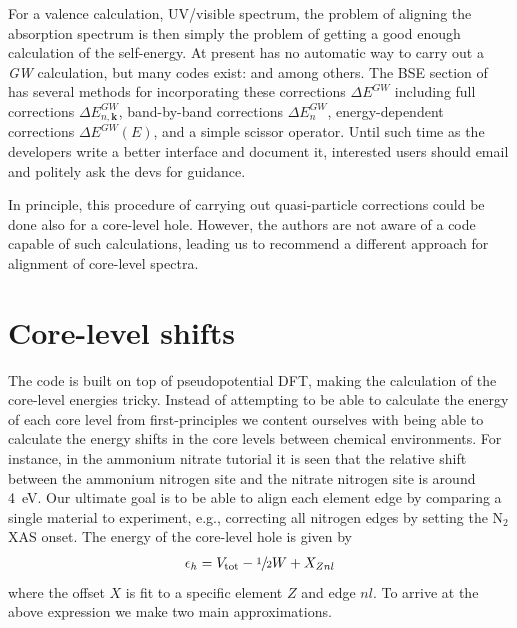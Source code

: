 \documentclass[11pt]{report}
\begin{document}
For a valence calculation, UV/visible spectrum, the problem of aligning the absorption spectrum is then simply the problem of getting a good enough calculation of the self-energy. 
At present  has no automatic way to carry out a {\it GW} calculation, but many codes exist:  and  among others. 
The BSE section of  has several methods for incorporating these corrections $\Delta E^{\textit{GW}}$ including full corrections $\Delta E^{\textit{GW}}_{n,\mathbf{k}}$, band-by-band corrections 
$\Delta E^{\textit{GW}}_{n}$, energy-dependent corrections $\Delta E^{\textit{GW}}(E)$, and a simple scissor operator.
Until such time as the developers write a better interface and document it, interested users should email and politely ask the devs for guidance. 

In principle, this procedure of carrying out quasi-particle corrections could be done also for a core-level hole. 
However, the authors are not aware of a code capable of such calculations, leading us to recommend a different approach for alignment of core-level spectra.

\section{Core-level shifts}

The  code is built on top of pseudopotential DFT, making the calculation of the core-level energies tricky. 
Instead of attempting to be able to calculate the energy of each core level from first-principles we content ourselves with being able to calculate the energy shifts in the core levels between chemical environments.
For instance, in the ammonium nitrate tutorial it is seen that the relative shift between the ammonium nitrogen site and the nitrate nitrogen site is around 4~eV. 
Our ultimate goal is to be able to align each element edge by comparing a single material to experiment, e.g., correcting all nitrogen edges by setting the N$_2$ XAS onset. 
The energy of the core-level hole is given by
\begin{align}
\epsilon_h = V_{\rm{tot}} - \sfrac{1}{2} W + X_{Znl}
\end{align}
where the offset $X$ is fit to a specific element $Z$ and edge $nl$. 
To arrive at the above expression we make two main approximations.
\end{document}
